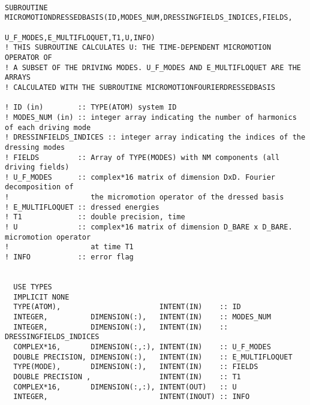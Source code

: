 \documentclass[10pt,a4paper]{article}
\begin{document}
\begin{verbatim}

SUBROUTINE MICROMOTIONDRESSEDBASIS(ID,MODES_NUM,DRESSINGFIELDS_INDICES,FIELDS,
                                                 U_F_MODES,E_MULTIFLOQUET,T1,U,INFO) 
! THIS SUBROUTINE CALCULATES U: THE TIME-DEPENDENT MICROMOTION OPERATOR OF 
! A SUBSET OF THE DRIVING MODES. U_F_MODES AND E_MULTIFLOQUET ARE THE ARRAYS
! CALCULATED WITH THE SUBROUTINE MICROMOTIONFOURIERDRESSEDBASIS

! ID (in)        :: TYPE(ATOM) system ID
! MODES_NUM (in) :: integer array indicating the number of harmonics of each driving mode
! DRESSINFIELDS_INDICES :: integer array indicating the indices of the dressing modes
! FIELDS         :: Array of TYPE(MODES) with NM components (all driving fields)
! U_F_MODES      :: complex*16 matrix of dimension DxD. Fourier decomposition of 
!                   the micromotion operator of the dressed basis
! E_MULTIFLOQUET :: dressed energies
! T1             :: double precision, time
! U              :: complex*16 matrix of dimension D_BARE x D_BARE. micromotion operator
!                   at time T1
! INFO           :: error flag


  USE TYPES
  IMPLICIT NONE
  TYPE(ATOM),                       INTENT(IN)    :: ID
  INTEGER,          DIMENSION(:),   INTENT(IN)    :: MODES_NUM
  INTEGER,          DIMENSION(:),   INTENT(IN)    :: DRESSINGFIELDS_INDICES
  COMPLEX*16,       DIMENSION(:,:), INTENT(IN)    :: U_F_MODES
  DOUBLE PRECISION, DIMENSION(:),   INTENT(IN)    :: E_MULTIFLOQUET
  TYPE(MODE),       DIMENSION(:),   INTENT(IN)    :: FIELDS
  DOUBLE PRECISION ,                INTENT(IN)    :: T1
  COMPLEX*16,       DIMENSION(:,:), INTENT(OUT)   :: U
  INTEGER,                          INTENT(INOUT) :: INFO
  

\end{verbatim}

\newpage
\end{document}
